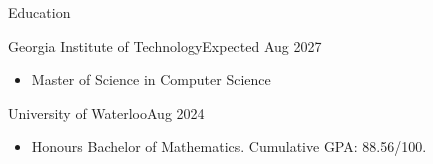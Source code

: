 \documentclass[]{mcdowellcv}
\begin{document}
	\makeheader
	\begin{cvsection}{Education}
		\begin{cvsubsection}{Georgia Institute of Technology}{}{Expected Aug 2027}
			\begin{itemize}
				\item Master of Science in Computer Science
			\end{itemize}
		\end{cvsubsection}
		\begin{cvsubsection}{University of Waterloo}{}{Aug 2024}
			\begin{itemize}
				\item Honours Bachelor of Mathematics. Cumulative GPA: 88.56/100.
			\end{itemize}
		\end{cvsubsection}
	\end{cvsection}
\end{document}
